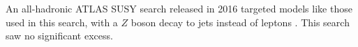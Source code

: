 An all-hadronic \ac{ATLAS} \ac{SUSY} search released in 2016 targeted models like those used in this search, with a $Z$ boson decay to jets instead of leptons \cite{ATLAS:2016kts}. This search saw no significant excess.







